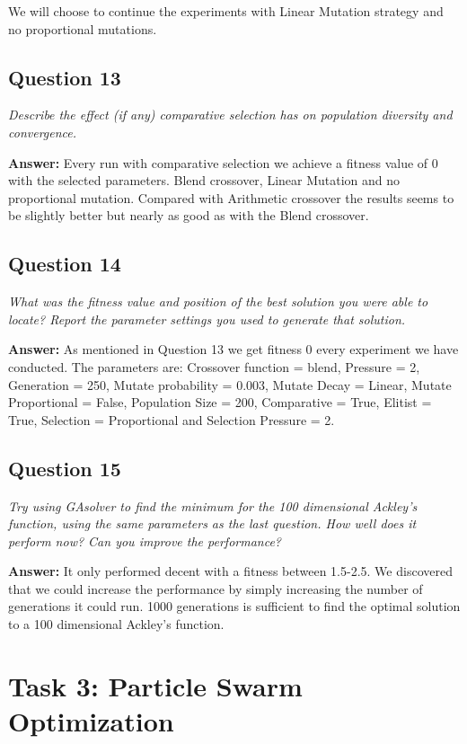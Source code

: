 \documentclass[a4paper]{article}
\begin{document}
We will choose to continue the experiments with Linear Mutation strategy and no proportional mutations. 

\subsection*{Question 13}
\emph{Describe the effect (if any) comparative selection has on population diversity and convergence.} 

\textbf{Answer:} Every run with comparative selection we achieve a fitness value of 0 with the selected parameters. Blend crossover, Linear Mutation and no proportional mutation. Compared with Arithmetic crossover the results seems to be slightly better but nearly as good as with the Blend crossover. 

\subsection*{Question 14}
\emph{What was the fitness value and position of the best solution you
were able to locate? Report the parameter settings you used to generate that solution.} 

\textbf{Answer:} As mentioned in Question 13 we get fitness 0 every experiment we have conducted. The parameters are: Crossover function = blend, Pressure = 2, Generation = 250, Mutate probability = 0.003, Mutate Decay = Linear, Mutate Proportional = False, Population Size = 200, Comparative = True, Elitist = True, Selection = Proportional and Selection Pressure = 2.

\subsection*{Question 15}
\emph{Try using GAsolver to find the minimum for the 100 dimensional Ackley's function, using the same parameters as the last question. How
well does it perform now? Can you improve the performance?} 

\textbf{Answer:} It only performed decent with a fitness between 1.5-2.5. We discovered that we could increase the performance by simply increasing the number of generations it could run. 1000 generations is sufficient to find the optimal solution to a 100 dimensional Ackley's function.

\section*{Task 3: Particle Swarm Optimization}
\end{document}
